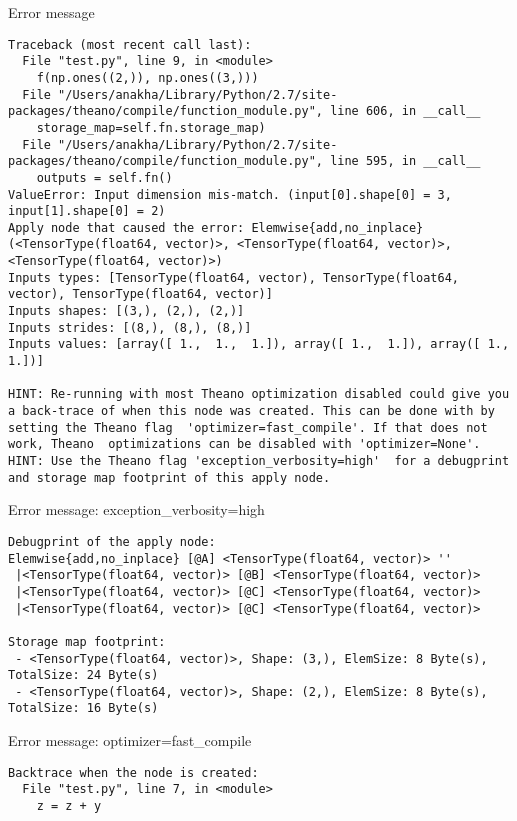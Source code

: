 \documentclass[utf8x,hyperref={pdfpagelabels=false}]{beamer}
\begin{document}
\begin{frame}{Error message}
\vspace{1em}
\begin{lstlisting}[style=output]
Traceback (most recent call last):
  File "test.py", line 9, in <module>
    f(np.ones((2,)), np.ones((3,)))
  File "/Users/anakha/Library/Python/2.7/site-packages/theano/compile/function_module.py", line 606, in __call__
    storage_map=self.fn.storage_map)
  File "/Users/anakha/Library/Python/2.7/site-packages/theano/compile/function_module.py", line 595, in __call__
    outputs = self.fn()
ValueError: Input dimension mis-match. (input[0].shape[0] = 3, input[1].shape[0] = 2)
Apply node that caused the error: Elemwise{add,no_inplace}(<TensorType(float64, vector)>, <TensorType(float64, vector)>, <TensorType(float64, vector)>)
Inputs types: [TensorType(float64, vector), TensorType(float64, vector), TensorType(float64, vector)]
Inputs shapes: [(3,), (2,), (2,)]
Inputs strides: [(8,), (8,), (8,)]
Inputs values: [array([ 1.,  1.,  1.]), array([ 1.,  1.]), array([ 1.,  1.])]

HINT: Re-running with most Theano optimization disabled could give you a back-trace of when this node was created. This can be done with by setting the Theano flag  'optimizer=fast_compile'. If that does not work, Theano  optimizations can be disabled with 'optimizer=None'.
HINT: Use the Theano flag 'exception_verbosity=high'  for a debugprint and storage map footprint of this apply node.
\end{lstlisting}
\end{frame}

\begin{frame}[fragile]{Error message: exception\_verbosity=high}
\begin{lstlisting}[style=output]
Debugprint of the apply node: 
Elemwise{add,no_inplace} [@A] <TensorType(float64, vector)> ''   
 |<TensorType(float64, vector)> [@B] <TensorType(float64, vector)>
 |<TensorType(float64, vector)> [@C] <TensorType(float64, vector)>
 |<TensorType(float64, vector)> [@C] <TensorType(float64, vector)>

Storage map footprint:
 - <TensorType(float64, vector)>, Shape: (3,), ElemSize: 8 Byte(s), TotalSize: 24 Byte(s)
 - <TensorType(float64, vector)>, Shape: (2,), ElemSize: 8 Byte(s), TotalSize: 16 Byte(s)
\end{lstlisting}
\end{frame}

\begin{frame}[fragile]{Error message: optimizer=fast\_compile}
\begin{lstlisting}[style=output]
Backtrace when the node is created:
  File "test.py", line 7, in <module>
    z = z + y
\end{lstlisting}
\end{frame}
\end{document}
